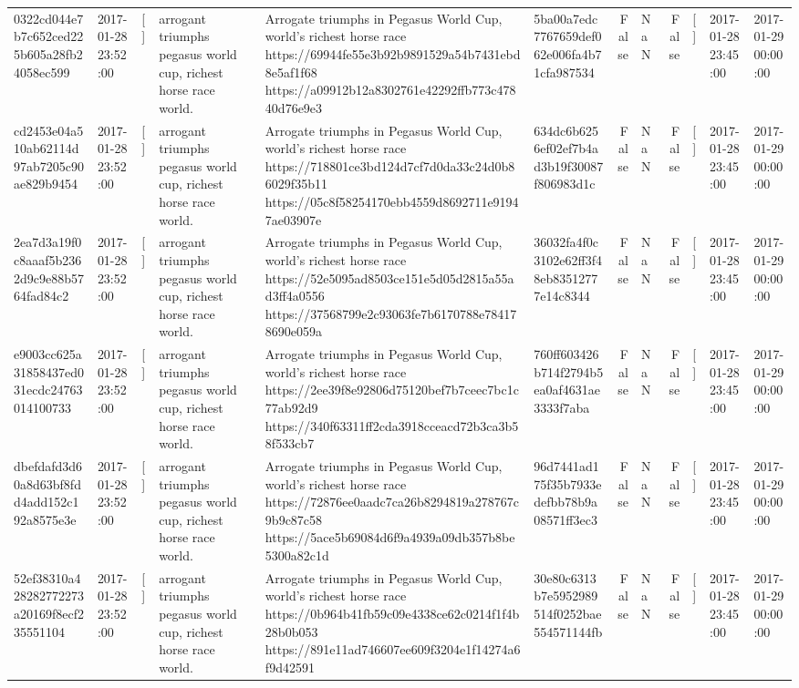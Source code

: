 \begin{tabular}{llllllrlrlll}
0322cd044e7b7c652ced225b605a28fb24058ec599 & 2017-01-28 23:52:00 & [] & arrogant triumphs pegasus world cup, richest horse race world. & Arrogate triumphs in Pegasus World Cup, world's richest horse race https://69944fe55e3b92b9891529a54b7431ebd8e5af1f68 https://a09912b12a8302761e42292ffb773c47840d76e9e3 & 5ba00a7edc7767659def062e006fa4b71cfa987534 & False & NaN & False & [] & 2017-01-28 23:45:00 & 2017-01-29 00:00:00 \\
cd2453e04a510ab62114d97ab7205c90ae829b9454 & 2017-01-28 23:52:00 & [] & arrogant triumphs pegasus world cup, richest horse race world. & Arrogate triumphs in Pegasus World Cup, world's richest horse race https://718801ce3bd124d7cf7d0da33c24d0b86029f35b11 https://05c8f58254170ebb4559d8692711e91947ae03907e & 634dc6b6256ef02ef7b4ad3b19f30087f806983d1c & False & NaN & False & [] & 2017-01-28 23:45:00 & 2017-01-29 00:00:00 \\
2ea7d3a19f0c8aaaf5b2362d9c9e88b5764fad84c2 & 2017-01-28 23:52:00 & [] & arrogant triumphs pegasus world cup, richest horse race world. & Arrogate triumphs in Pegasus World Cup, world's richest horse race https://52e5095ad8503ce151e5d05d2815a55ad3ff4a0556 https://37568799e2c93063fe7b6170788e784178690e059a & 36032fa4f0c3102e62ff3f48eb83512777e14c8344 & False & NaN & False & [] & 2017-01-28 23:45:00 & 2017-01-29 00:00:00 \\
e9003cc625a31858437ed031ecdc24763014100733 & 2017-01-28 23:52:00 & [] & arrogant triumphs pegasus world cup, richest horse race world. & Arrogate triumphs in Pegasus World Cup, world's richest horse race https://2ee39f8e92806d75120bef7b7ceec7bc1c77ab92d9 https://340f63311ff2cda3918cceacd72b3ca3b58f533cb7 & 760ff603426b714f2794b5ea0af4631ae3333f7aba & False & NaN & False & [] & 2017-01-28 23:45:00 & 2017-01-29 00:00:00 \\
dbefdafd3d60a8d63bf8fdd4add152c192a8575e3e & 2017-01-28 23:52:00 & [] & arrogant triumphs pegasus world cup, richest horse race world. & Arrogate triumphs in Pegasus World Cup, world's richest horse race https://72876ee0aadc7ca26b8294819a278767c9b9c87c58 https://5ace5b69084d6f9a4939a09db357b8be5300a82c1d & 96d7441ad175f35b7933edefbb78b9a08571ff3ec3 & False & NaN & False & [] & 2017-01-28 23:45:00 & 2017-01-29 00:00:00 \\
52ef38310a428282772273a20169f8ecf235551104 & 2017-01-28 23:52:00 & [] & arrogant triumphs pegasus world cup, richest horse race world. & Arrogate triumphs in Pegasus World Cup, world's richest horse race https://0b964b41fb59c09e4338ce62c0214f1f4b28b0b053 https://891e11ad746607ee609f3204e1f14274a6f9d42591 & 30e80c6313b7e5952989514f0252bae554571144fb & False & NaN & False & [] & 2017-01-28 23:45:00 & 2017-01-29 00:00:00 \\

\end{tabular}
